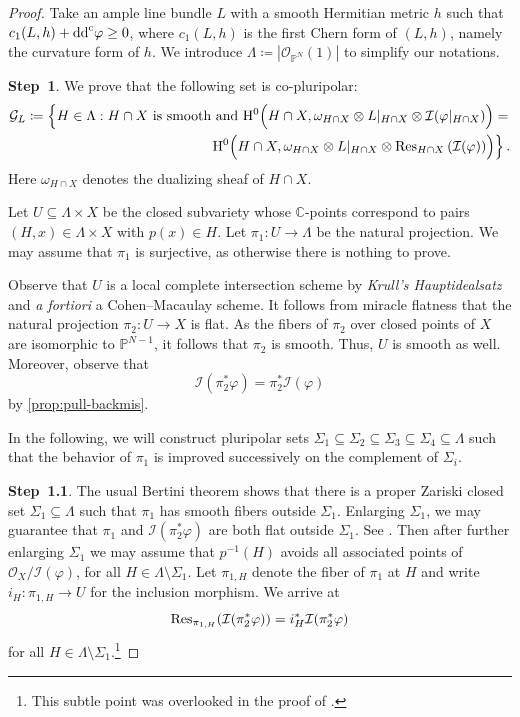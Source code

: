 \begin{proof}

Take an ample line bundle $L$ with a smooth Hermitian metric $h$ such that $c_1(L,h)+\mathrm{dd}^{\mathrm{c}}\varphi\geq 0$, where $c_1(L,h)$ is the first Chern form of $(L,h)$, namely the curvature form of $h$.
We introduce $\Lambda\coloneqq |\mathcal{O}_{\mathbb{P}^N}(1)|$ to simplify our notations.

\textbf{Step~1}.
We prove that the following set is co-pluripolar:
\[
\begin{split}
\mathcal{G}_{L}\coloneqq \left\{H\in \Lambda: H\cap X \text{ is smooth and } \mathrm{H}^0\Bigl(H\cap X,\omega_{H\cap X}\otimes L|_{H\cap X}\otimes \mathcal{I}(\varphi|_{H\cap X})\Bigr)= \right.\\
\left. \mathrm{H}^0\Bigl(H\cap X,\omega_{H\cap X}\otimes L|_{H\cap X}\otimes \operatorname{Res}_{H\cap X}\left(\mathcal{I}(\varphi)\right)\Bigr)\right\}.
\end{split}
\]
Here $\omega_{H\cap X}$ denotes the dualizing sheaf of $H\cap X$.

Let $U\subseteq \Lambda\times X$ be the closed subvariety whose $\mathbb{C}$-points correspond to pairs $(H,x)\in \Lambda\times X$ with $p(x)\in H$.
Let $\pi_1\colon U\rightarrow \Lambda$ be the natural projection. We may assume that $\pi_1$ is surjective, as otherwise there is nothing to prove.

Observe that $U$ is a local complete intersection scheme by \emph{Krull's Hauptidealsatz} and \emph{a fortiori} a Cohen--Macaulay scheme. It follows from miracle flatness \cite[Theorem~23.1]{Mat89} that the natural projection $\pi_2\colon U\rightarrow X$ is flat. As the fibers of $\pi_2$ over closed points of $X$ are isomorphic to $\mathbb{P}^{N-1}$, it follows that $\pi_2$ is smooth. Thus, $U$ is smooth as well. Moreover, observe that
\begin{equation}\label{eq:pi2pullvarphiItemp1}
    \mathcal{I}(\pi_2^*\varphi)=\pi_2^*\mathcal{I}(\varphi)
\end{equation}
by \cref{prop:pull-backmis}.

In the following, we will construct pluripolar sets $\Sigma_1\subseteq \Sigma_2 \subseteq \Sigma_3\subseteq \Sigma_4\subseteq \Lambda$ such that the behavior of $\pi_1$ is improved successively on the complement of $\Sigma_i$.


\textbf{Step~1.1}.
The usual Bertini theorem shows that there is a proper Zariski closed set $\Sigma_1\subseteq \Lambda$ such that $\pi_1$ has smooth fibers outside $\Sigma_1$. Enlarging $\Sigma_1$, we may guarantee that $\pi_1$ and $\mathcal{I}(\pi_2^*\varphi)$ are both flat outside $\Sigma_1$. See \cite[Théorème~6.9.1]{EGAIV2}.
Then after further enlarging $\Sigma_1$ we may assume that $p^{-1}(H)$ avoids all associated points of $\mathcal{O}_X/\mathcal{I}(\varphi)$, for all $H\in \Lambda\setminus \Sigma_1$. Let $\pi_{1,H}$ denote the fiber of $\pi_1$ at $H$ and write $i_H\colon \pi_{1,H}\rightarrow U$ for the inclusion morphism.
We arrive at
\[
\operatorname{Res}_{\pi_{1,H}}(\mathcal{I}(\pi_2^*\varphi))=i_H^*\mathcal{I}(\pi_2^*\varphi)
\]
for all $H\in \Lambda\setminus \Sigma_1$.\footnote{This subtle point was overlooked in the proof of \cite{XiaBer}.}


\end{proof}
